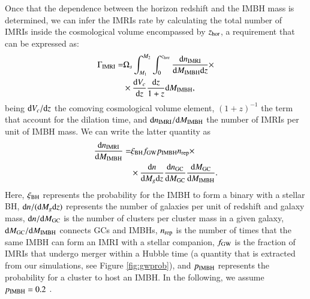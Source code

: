 \documentclass[article]{aa}
\newcommand{\derd}{{\rm d}}
\newcommand{\gw}{{\rm GW}}
\newcommand{\gc}{{\rm GC}}
\newcommand{\ibh}{{\rm IMBH}}
\newcommand{\imri}{{\rm IMRI}}
\newcommand{\bh}{{\rm BH}}
\begin{document}
Once that the dependence between the horizon redshift and the IMBH mass is determined, we can infer the IMRIs rate by calculating the total number of IMRIs inside the cosmological volume encompassed by $z_{\rm hor}$, a requirement that can be expressed as:
\begin{align}
\Gamma_{\imri} = & \Omega_s \int_{M_{1}}^{M_{2}} \int_{0}^{z_{\rm hor}} \frac{\derd n_{\imri}}{\derd M_\ibh\derd z} \times \nonumber \\
& \times \frac{\derd V_c}{\derd z}  \frac{\derd z}{1+z} \derd M_\ibh,
\end{align}
being $\derd V_c/\derd z$ the comoving cosmological volume element, $(1+z)^{-1}$ the term that account for the dilation time, and $\derd n_{\imri}/\derd M_\ibh$ the number of IMRIs per unit of IMBH mass. We can write the latter quantity as
\begin{align}
\frac{\derd n_{\imri}}{\derd M_\ibh} =& \xi_\bh f_{\gw} p_\ibh n_{\rm rep}\times \nonumber \\
& \times \frac{\derd n}{\derd M_g\derd z}\frac{\derd n_\gc}{\derd M_\gc}\frac{\derd M_\gc}{\derd M_\ibh}.
\end{align}
Here, $\xi_\bh$ represents the probability for the IMBH to form a binary with a stellar BH, $\derd n/(\derd M_g \derd z)$ represents the number of galaxies per unit of redshift and galaxy mass, $\derd n/\derd M_\gc$ is the number of clusters per cluster mass in a given galaxy, $\derd M_\gc/\derd M_\ibh$ connects GCs and IMBHs, $n_{\rm rep}$ is the number of times that the same IMBH can form an IMRI with a stellar companion, $f_{\gw}$ is the fraction of IMRIs that undergo merger within a Hubble time (a quantity that is extracted from our simulations, see Figure \ref{fig:gwprob}), and $p_\ibh$ represents the probability for a cluster to host an IMBH. In the following, we assume $p_\ibh = 0.2$ \citep{giersz15}. 
\end{document}
